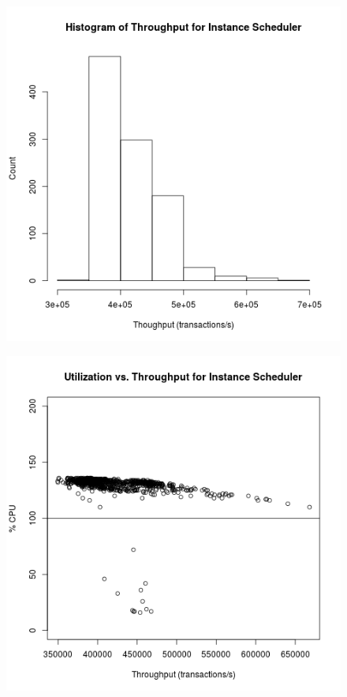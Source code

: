 \begin{figure}
\center
\includegraphics[width=\textwidth]{instance_throughput_hist.png}
\caption{\label{instance_throughput}}
\end{figure}

\begin{figure}
\center
\includegraphics[width=\textwidth]{instance_throughput_utilization.png}
\caption{\label{instance_throughput_utilization}}
\end{figure}

